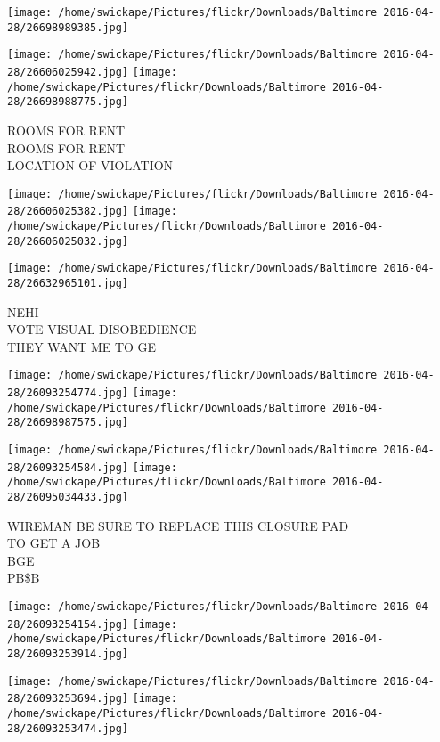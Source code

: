 \documentclass[10pt,letterpaper]{article}
\begin{document}
\texttt{[image: /home/swickape/Pictures/flickr/Downloads/Baltimore 2016-04-28/26698989385.jpg]}

\vspace{0.25in}
\texttt{[image: /home/swickape/Pictures/flickr/Downloads/Baltimore 2016-04-28/26606025942.jpg]}
\texttt{[image: /home/swickape/Pictures/flickr/Downloads/Baltimore 2016-04-28/26698988775.jpg]}

ROOMS FOR RENT\\
ROOMS FOR RENT\\
LOCATION OF VIOLATION\\
\pagebreak

\texttt{[image: /home/swickape/Pictures/flickr/Downloads/Baltimore 2016-04-28/26606025382.jpg]}
\texttt{[image: /home/swickape/Pictures/flickr/Downloads/Baltimore 2016-04-28/26606025032.jpg]}

\vspace{0.25in}
\texttt{[image: /home/swickape/Pictures/flickr/Downloads/Baltimore 2016-04-28/26632965101.jpg]}

NEHI\\
VOTE VISUAL DISOBEDIENCE\\
THEY WANT ME TO GE\\
\pagebreak

\texttt{[image: /home/swickape/Pictures/flickr/Downloads/Baltimore 2016-04-28/26093254774.jpg]}
\texttt{[image: /home/swickape/Pictures/flickr/Downloads/Baltimore 2016-04-28/26698987575.jpg]}

\texttt{[image: /home/swickape/Pictures/flickr/Downloads/Baltimore 2016-04-28/26093254584.jpg]}
\texttt{[image: /home/swickape/Pictures/flickr/Downloads/Baltimore 2016-04-28/26095034433.jpg]}

WIREMAN BE SURE TO REPLACE THIS CLOSURE PAD\\
TO GET A JOB\\
BGE\\
PB\$B\\
\pagebreak

\texttt{[image: /home/swickape/Pictures/flickr/Downloads/Baltimore 2016-04-28/26093254154.jpg]}
\texttt{[image: /home/swickape/Pictures/flickr/Downloads/Baltimore 2016-04-28/26093253914.jpg]}

\texttt{[image: /home/swickape/Pictures/flickr/Downloads/Baltimore 2016-04-28/26093253694.jpg]}
\texttt{[image: /home/swickape/Pictures/flickr/Downloads/Baltimore 2016-04-28/26093253474.jpg]}
\end{document}
